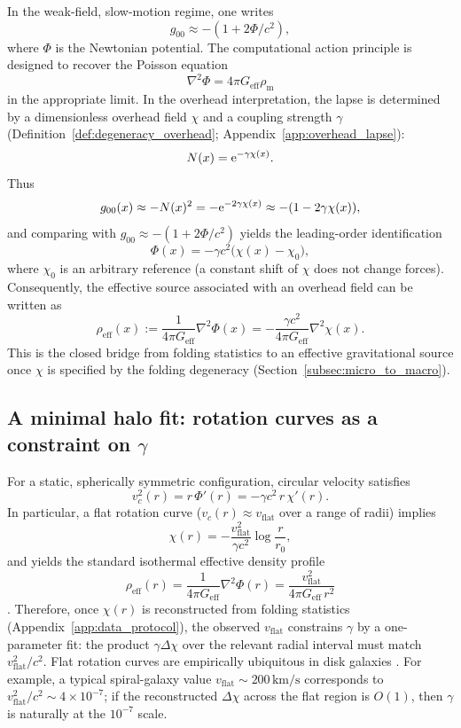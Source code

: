 In the weak-field, slow-motion regime, one writes \cite{Wald1984}
\[
g_{00}\approx -(1+2\Phi/c^2),
\]
where $\Phi$ is the Newtonian potential.
The computational action principle is designed to recover the Poisson equation
\[
\nabla^2\Phi = 4\pi G_{\mathrm{eff}}\rho_{\mathrm{m}}
\]
in the appropriate limit.
In the overhead interpretation, the lapse is determined by a dimensionless overhead field $\chi$ and a coupling strength $\gamma$ (Definition~\ref{def:degeneracy_overhead}; Appendix~\ref{app:overhead_lapse}):
\[
N(x)=\mathrm{e}^{-\gamma\chi(x)}.
\]
Thus
\[
g_{00}(x)\approx -N(x)^2=-\mathrm{e}^{-2\gamma\chi(x)}
\approx -(1-2\gamma\chi(x)),
\]
and comparing with $g_{00}\approx -(1+2\Phi/c^2)$ yields the leading-order identification
\[
\Phi(x)= -\gamma c^2\bigl(\chi(x)-\chi_0\bigr),
\]
where $\chi_0$ is an arbitrary reference (a constant shift of $\chi$ does not change forces).
Consequently, the effective source associated with an overhead field can be written as
\[
\rho_{\mathrm{eff}}(x):=\frac{1}{4\pi G_{\mathrm{eff}}}\nabla^2\Phi(x)
=-\frac{\gamma c^2}{4\pi G_{\mathrm{eff}}}\nabla^2\chi(x).
\]
This is the closed bridge from folding statistics to an effective gravitational source once $\chi$ is specified by the folding degeneracy (Section~\ref{subsec:micro_to_macro}).

\subsection{A minimal halo fit: rotation curves as a constraint on \texorpdfstring{$\gamma$}{gamma}}
\label{subsec:rotation_fit}

For a static, spherically symmetric configuration, circular velocity satisfies
\[
v_c^2(r)=r\,\Phi'(r)= -\gamma c^2\, r\,\chi'(r).
\]
In particular, a flat rotation curve ($v_c(r)\approx v_{\mathrm{flat}}$ over a range of radii) implies
\[
\chi(r)= -\frac{v_{\mathrm{flat}}^2}{\gamma c^2}\log\frac{r}{r_0},
\]
and yields the standard isothermal effective density profile
\[
\rho_{\mathrm{eff}}(r)=\frac{1}{4\pi G_{\mathrm{eff}}}\nabla^2\Phi(r)
=\frac{v_{\mathrm{flat}}^2}{4\pi G_{\mathrm{eff}}\,r^2}
\]
\cite{BinneyTremaine2008}.
Therefore, once $\chi(r)$ is reconstructed from folding statistics (Appendix~\ref{app:data_protocol}), the observed $v_{\mathrm{flat}}$ constrains $\gamma$ by a one-parameter fit:
the product $\gamma\Delta\chi$ over the relevant radial interval must match $v_{\mathrm{flat}}^2/c^2$.
Flat rotation curves are empirically ubiquitous in disk galaxies \cite{SofueRubin2001}.
For example, a typical spiral-galaxy value $v_{\mathrm{flat}}\sim 200\,\mathrm{km/s}$ corresponds to $v_{\mathrm{flat}}^2/c^2\sim 4\times 10^{-7}$; if the reconstructed $\Delta\chi$ across the flat region is $O(1)$, then $\gamma$ is naturally at the $10^{-7}$ scale.

